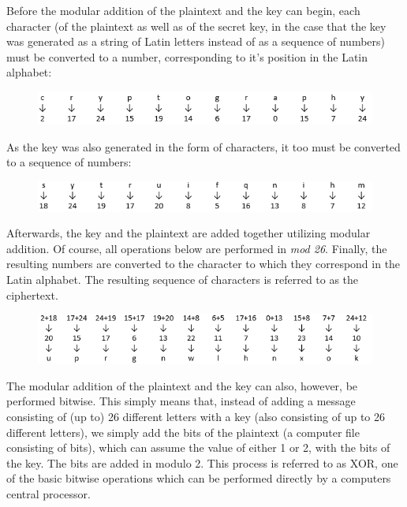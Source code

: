 \documentclass[12pt]{report}
\theoremstyle{definition}
\theoremstyle{remark}
\begin{document}
Before the modular addition of the plaintext and the key can begin, each character (of the plaintext as well as of the secret key, in the case that the key was generated as a string of Latin letters instead of as a sequence of numbers) must be converted to a number, corresponding to it's position in the Latin alphabet:

\begin{figure}[H]
\centering
\includegraphics[scale=1]{Table1.PNG}		
\end{figure}


As the key was also generated in the form of characters, it too must be converted to a sequence of numbers:

\begin{figure}[H]
\centering
\includegraphics[scale=1]{Table2.PNG}
\end{figure}

Afterwards, the key and the plaintext are added together utilizing modular addition. Of course, all operations below are performed in \textit{mod 26}. Finally, the resulting numbers are converted to the character to which they correspond in the Latin alphabet. The resulting sequence of characters is referred to as the ciphertext.

\begin{figure}[H]
\centering
\includegraphics[scale=1]{Table3.PNG}
\end{figure}

The modular addition of the plaintext and the key can also, however, be performed bitwise. This simply means that, instead of adding a message consisting of (up to) 26 different letters with a key (also consisting of up to 26 different letters), we simply add the bits of the plaintext (a computer file consisting of bits), which can assume the value of either 1 or 2, with the bits of the key. The bits are added in modulo 2. This process is referred to as XOR, one of the basic bitwise operations which can be performed directly by a computers central processor.
\end{document}
